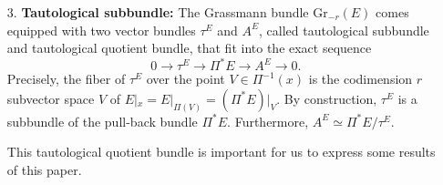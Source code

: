 \documentclass[10pt]{article}
\theoremstyle{plain}
\theoremstyle{definition}
\theoremstyle{remark}
\newtheorem{convention}[lemma]{Convention}
\begin{document}
\begin{enumerate}
 For every open subset $\mathcal U\subset M$ on which $E$ is trivial, $\Pi^{-1}(\mathcal U)\simeq \mathcal{U}\times\mathrm{Gr}_{-r}(\mathbb{K}^d).$ An \emph{adapted chart} for $\mathrm{Gr}_{-r}({E})\longrightarrow M$ around a point $x\in M$ is a set of local coordinates of the form $(\Pi^*x_1,\ldots \Pi^*x_n,z_1,\ldots, z_{r(d-r)}),$ where $(x_1,\ldots,x_n)$ are local coordinates on $M$ and $(z_1,\ldots, z_{r(d-r)})$ are functions which are standard affine coordinates on an open subset of each fiber of $\Pi$ as in item (1). 
\begin{convention}
{Let $x\in M$. Let $e_1, \ldots, e_d$ be local frame for $E$ in a neighborhood $\mathcal{U}$ of $x$. For $y\in \mathcal{U}$, let $\kappa_y$ be the linear isomorphism  defined by
\begin{equation*}
    \kappa_y\colon  E_x \longrightarrow E_y,\; \kappa_y (e_i(x)) = e_i(y),\quad\text{for all}\quad i \in \{1,\ldots, d\}.
\end{equation*} Let $(x_n)$ be a sequence of $M$ that converges to $x$. We will say that a sequence of vector space  $V_{x_n}\in \mathrm{Gr}_{-r}({E}) $ with $V_{x_n}\subset E_{x_n}$, converges to $V\subset E_x$ and write $V_{x_n}\underset{n\rightarrow+\infty}{\longrightarrow} V$ if 
\begin{equation*}
  \kappa_{x_n}^{-1}(V_{x_n})\underset{n\rightarrow+\infty}{\longrightarrow} V \; \text{in}\;\mathrm{Gr}_{-r}({E_x}).
\end{equation*}}
In the sequel, we will not mention $\kappa_{x_n}$, since this notion of convergence does not depend on the  chosen local frames of $E$.
\end{convention}
 \item[3.] \textbf{Tautological subbundle:} The Grassmann bundle $\mathrm{Gr}_{-r}(E)$ comes equipped with two vector bundles $\tau^E$ and $A^E$, called tautological subbundle and tautological quotient bundle, that fit into the exact sequence\begin{equation}
     0\longrightarrow \tau^E\longrightarrow \Pi^*E\longrightarrow A^E\longrightarrow 0.
 \end{equation}
 Precisely, the fiber  of $\tau^E$ over the point $V\in \Pi^{-1}(x)$ is the codimension $r$ subvector space $V$ of $E|_x=E|_{\Pi(V)}=(\Pi^*E)|_{V}$. By construction, $\tau^E$
is a subbundle of the pull-back bundle $\Pi^*E$. Furthermore,  $A^E\simeq \Pi^*E/\tau^E$.
 
 This tautological quotient bundle is important for us to express some results of this paper.
 \end{enumerate}
\end{document}
